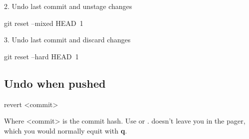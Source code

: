 2. Undo last commit and unstage changes
\begin{gitBashBox}
git reset --mixed HEAD~1
\end{gitBashBox}

3. Undo last commit and discard changes
\begin{gitBashBox}
git reset --hard HEAD~1
\end{gitBashBox}

\subsection{Undo when pushed}
\begin{gitBashBox}
revert <commit>
\end{gitBashBox}
Where <commit> is the commit hash.
Use  or .
 doesn't leave you in the pager, which you would normally equit with \textbf{q}.



